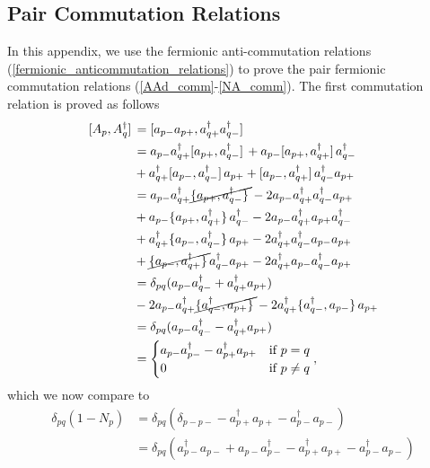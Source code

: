 \documentclass[10pt]{article}
\begin{document}
\begin{appendices}
\chapter{Pair Commutation Relations}
\label{appendix:pair_commutation_relations}

In this appendix, we use the fermionic anti-commutation relations (\ref{fermionic_anticommutation_relations})
to prove the pair fermionic commutation relations (\ref{AAd_comm}-\ref{NA_comm}).
The first commutation relation is proved as follows
\begin{align}
\comm*{A_p}{A^\dagger_q}
&=
\comm*{a_{p-}a_{p+}}{a^\dagger_{q+}a^\dagger_{q-}}
\\
&=
a_{p-}a^\dagger_{q+}\comm*{a_{p+}}{a^\dagger_{q-}}
+
a_{p-}\comm*{a_{p+}}{a^\dagger_{q+}}a^\dagger_{q-}
\nonumber
\\
&+
a^\dagger_{q+}\comm*{a_{p-}}{a^\dagger_{q-}}a_{p+}
+
\comm*{a_{p-}}{a^\dagger_{q+}}a^\dagger_{q-}a_{p+}
\\
&=
a_{p-}a^\dagger_{q+}\cancel{\acomm*{a_{p+}}{a^\dagger_{q-}}}
-
2a_{p-}a^\dagger_{q+}a^\dagger_{q-}a_{p+}
\nonumber
\\
&+
a_{p-}\acomm*{a_{p+}}{a^\dagger_{q+}}a^\dagger_{q-}
-
2a_{p-}a^\dagger_{q+}a_{p+}a^\dagger_{q-}
\nonumber
\\
&+
a^\dagger_{q+}\acomm*{a_{p-}}{a^\dagger_{q-}}a_{p+}
-
2a^\dagger_{q+}a^\dagger_{q-}a_{p-}a_{p+}
\nonumber
\\
&+
\cancel{\acomm*{a_{p-}}{a^\dagger_{q+}}}a^\dagger_{q-}a_{p+}
-
2a^\dagger_{q+}a_{p-}a^\dagger_{q-}a_{p+}
\\
&=
\delta_{pq}(a_{p-}a^\dagger_{q-}+a^\dagger_{q+}a_{p+})
\nonumber
\\
&-
2a_{p-}a^\dagger_{q+}\cancel{\acomm*{a^\dagger_{q-}}{a_{p+}}}
-
2a^\dagger_{q+}\acomm*{a^\dagger_{q-}}{a_{p-}}a_{p+}
\\
&=
\delta_{pq}(a_{p-}a^\dagger_{q-}-a^\dagger_{q+}a_{p+})
\\
&=
\begin{cases}
a_{p-}a^\dagger_{p-}-a^\dagger_{p+}a_{p+} & \text{if} \ p=q
\\
0 & \text{if} \ p\neq q
\end{cases},
\end{align}
which we now compare to
\begin{align}
\delta_{pq}(1-N_p)
&=
\delta_{pq}(\delta_{p-p-}-a^\dagger_{p+}a_{p+}-a^\dagger_{p-}a_{p-})
\\
&=
\delta_{pq}(a^\dagger_{p-}a_{p-}+a_{p-}a^\dagger_{p-}-a^\dagger_{p+}a_{p+}-a^\dagger_{p-}a_{p-})

\end{align}
\end{appendices}
\end{document}
